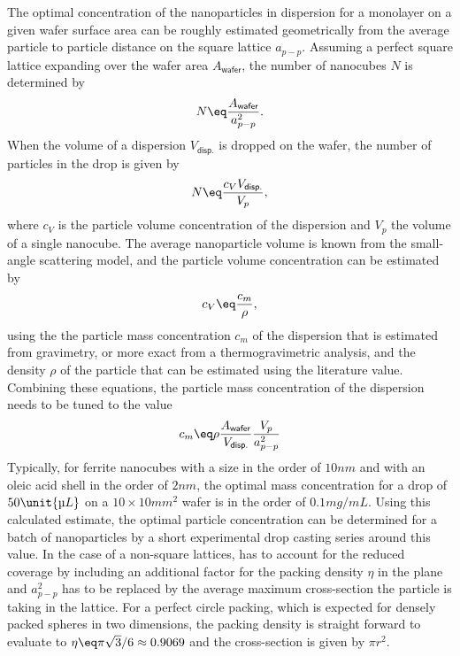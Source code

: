 \documentclass[\main/dresen_thesis.tex]{subfiles}
\begin{document}
    The optimal concentration of the nanoparticles in dispersion for a monolayer on a given wafer surface area can be roughly estimated geometrically from the average particle to particle distance on the square lattice $a_{p-p}$.
    Assuming a perfect square lattice expanding over the wafer area $A_{\textsf{wafer}}$, the number of nanocubes $N$ is determined by
    \begin{align}
      N \eq \frac{A_{\textsf{wafer}}}{a_{p-p}^2}.
    \end{align}
    When the volume of a dispersion $V_{\textsf{disp.}}$ is dropped on the wafer, the number of particles in the drop is given by
    \begin{align}
      N \eq \frac{c_V V_{\textsf{disp.}}}{V_p},
    \end{align}
    where $c_V$ is the particle volume concentration of the dispersion and $V_p$ the volume of a single nanocube.
    The average nanoparticle volume is known from the small-angle scattering model, and the particle volume concentration can be estimated by
    \begin{align}
      c_V \eq \frac{c_m}{\rho},
    \end{align}
    using the the particle mass concentration $c_m$ of the dispersion that is estimated from gravimetry, or more exact from a thermogravimetric analysis, and the density $\rho$ of the particle that can be estimated using the literature value.
    Combining these equations, the particle mass concentration of the dispersion needs to be tuned to the value
    \begin{align}\label{eq:monolayers:preparation:particleConcentration}
      c_m \eq \rho \frac{A_{\textsf{wafer}}}{V_{\textsf{disp.}}} \frac{V_p}{a_{p-p}^2}
    \end{align}
    Typically, for ferrite nanocubes with a size in the order of $10 \unit{nm}$ and with an oleic acid shell in the order of $2 \unit{nm}$, the optimal mass concentration for a drop of $50 \unit{\text{\textmu} L}$ on a $10\times 10 \unit{mm^2}$ wafer is in the order of $0.1 \unit{mg/mL}$.
    Using this calculated estimate, the optimal particle concentration can be determined for a batch of nanoparticles by a short experimental drop casting series around this value.
    In the case of a non-square lattices,  has to account for the reduced coverage by including an additional factor for the packing density $\eta$ in the plane and $a_{p-p}^2$ has to be replaced by the average maximum cross-section the particle is taking in the lattice.
    For a perfect circle packing, which is expected for densely packed spheres in two dimensions, the packing density is straight forward to evaluate to $\eta \eq \pi \sqrt{3} / 6 \approx 0.9069$ and the cross-section is given by $\pi r^2$.
\end{document}
